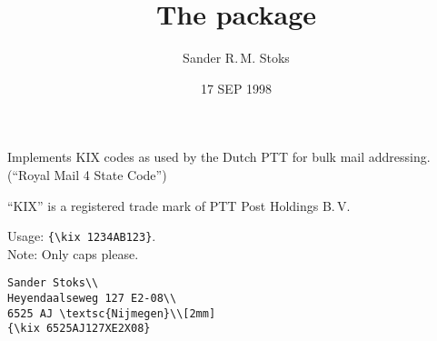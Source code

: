 \documentclass[fontsize=13pt, DIV=8, parskip=half, pagesize=auto]{scrartcl}
\title{The \pkg{kix} package}
\author{Sander R.\,M. Stoks\\\mail{sanders@sumware.demon.nl}}
\date{17 SEP 1998}
\begin{document}
\maketitle

Implements KIX codes as used by the Dutch PTT for bulk mail
addressing. (``Royal Mail 4 State Code'')

``KIX'' is a registered trade mark of PTT Post Holdings B.\,V.

Usage: \verb+{\kix 1234AB123}+.\\
Note: Only caps please.



\begin{verbatim}
Sander Stoks\\
Heyendaalseweg 127 E2-08\\
6525 AJ \textsc{Nijmegen}\\[2mm]
{\kix 6525AJ127XE2X08}
\end{verbatim}
\end{document}
